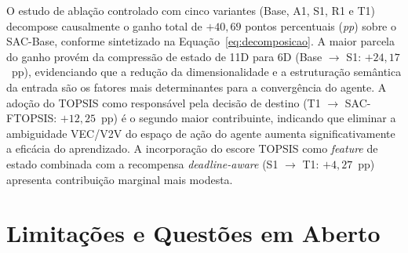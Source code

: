 O estudo de ablação controlado com cinco variantes (Base, A1, S1, R1 e T1) decompose causalmente o ganho total de $+40{,}69$ pontos percentuais (\textit{pp}) sobre o \gls{SAC}-Base, conforme sintetizado na Equação~\ref{eq:decomposicao}. A maior parcela do ganho provém da compressão de estado de 11D para 6D (Base $\to$ S1: $+24{,}17$~pp), evidenciando que a redução da dimensionalidade e a estruturação semântica da entrada são os fatores mais determinantes para a convergência do agente. A adoção do \gls{TOPSIS} como responsável pela decisão de destino (T1 $\to$ \gls{SAC}-FTOPSIS: $+12{,}25$~pp) é o segundo maior contribuinte, indicando que eliminar a ambiguidade \gls{VEC}/\gls{V2V} do espaço de ação do agente aumenta significativamente a eficácia do aprendizado. A incorporação do escore \gls{TOPSIS} como \textit{feature} de estado combinada com a recompensa \textit{deadline-aware} (S1 $\to$ T1: $+4{,}27$~pp) apresenta contribuição marginal mais modesta.



\section{Limitações e Questões em Aberto}
\label{sec:limitacoes}

